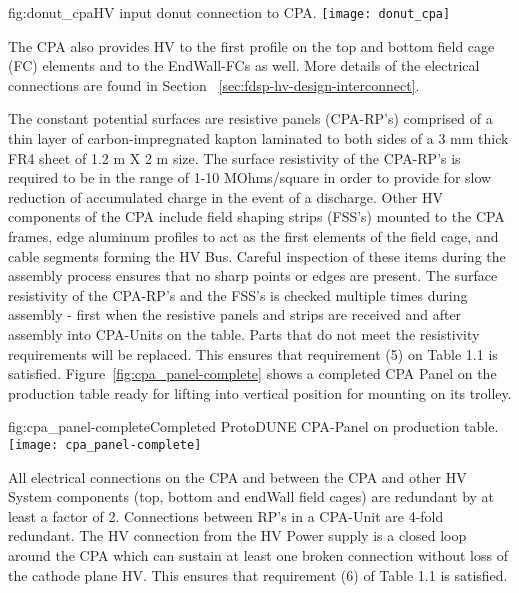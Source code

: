 \begin{dunefigure}{fig:donut_cpa}{HV input donut connection to CPA.}
\texttt{[image: donut\_cpa]} %
\end{dunefigure}

The CPA also provides HV to the first profile on the top and bottom field cage (FC) elements and to the EndWall-FCs as well. More details of the electrical connections are found in Section ~\ref{sec:fdsp-hv-design-interconnect}.

The constant potential surfaces are resistive panels (CPA-RP's) comprised of a thin layer of carbon-impregnated kapton laminated to both sides of a 3 mm thick FR4 sheet of 1.2 m X 2 m size.  The surface resistivity of the CPA-RP's is required to be in the range of 1-10 MOhms/square in order to provide for slow reduction of accumulated charge in the event of a discharge.  Other HV components of the CPA include field shaping strips (FSS's) mounted to the CPA frames, edge aluminum profiles to act as the first elements of the field cage, and cable segments forming the HV Bus. Careful inspection of these items during the assembly process ensures that no sharp points or edges are present. The surface resistivity of the CPA-RP's and the FSS's is checked multiple times during assembly - first when the resistive panels and strips are received and after assembly into CPA-Units on the table.  Parts that do not meet the resistivity requirements will be replaced.  This ensures that requirement (5) on Table 1.1 is satisfied.  Figure~\ref{fig:cpa_panel-complete} shows a completed CPA Panel on the production table ready for lifting into vertical position for mounting on its trolley.

\begin{dunefigure}{fig:cpa_panel-complete}{Completed ProtoDUNE CPA-Panel on production table.}
\texttt{[image: cpa\_panel-complete]}
\end{dunefigure}

All electrical connections on the CPA and between the CPA and other HV System components (top, bottom and endWall field cages) are redundant by at least a factor of 2.  Connections between RP's in a CPA-Unit are 4-fold redundant.  The HV connection from the HV Power supply is a closed loop around the CPA which can sustain at least one broken connection without loss of the cathode plane HV.  This ensures that requirement (6) of Table 1.1 is satisfied.

